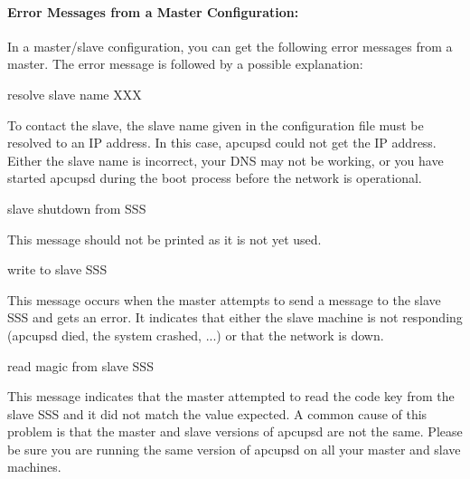 {{{{{{{{{\label{Error-Messages-from-a-Master-Configuration}

\paragraph*{Error Messages from a Master Configuration:}

In a master/slave configuration, you can get the following error messages from
a master. The error message is followed by a possible explanation: 

\label{Cannot-resolve-slave-name-XXX}

{\smallCannot resolve slave name XXX}

To contact the slave, the slave name given in the configuration file must be
resolved to an IP address. In this case, apcupsd could not get the IP address.
Either the slave name is incorrect, your DNS may not be working, or you have
started apcupsd during the boot process before the network is operational. 

\label{Got-slave-shutdown-from-SSS}

{\smallGot slave shutdown from SSS}

This message should not be printed as it is not yet used. 

\label{Cannot-write-to-slave-SSS}

{\smallCannot write to slave SSS}

This message occurs when the master attempts to send a message to the slave
SSS and gets an error. It indicates that either the slave machine is not
responding (apcupsd died, the system crashed, ...) or that the network is
down. 

\label{Cannot-read-magic-from-slave-SSS}

{\smallCannot read magic from slave SSS}

This message indicates that the master attempted to read the code key from the
slave SSS and it did not match the value expected. A common cause of this
problem is that the master and slave versions of apcupsd are not the same.
Please be sure you are running the same version of apcupsd on all your master
and slave machines. 

}}}}}}}}}
